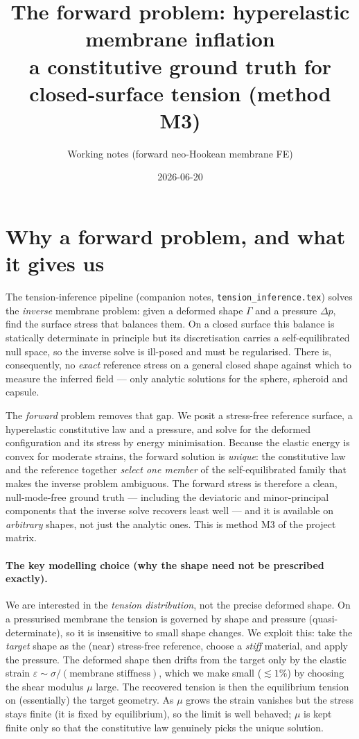 \documentclass[11pt]{article}
\title{The forward problem: hyperelastic membrane inflation\\
\large a constitutive ground truth for closed-surface tension (method M3)}
\author{Working notes (forward neo-Hookean membrane FE)}
\date{2026-06-20}
\begin{document}
\maketitle
\tableofcontents
\bigskip

\section{Why a forward problem, and what it gives us}
\label{sec:why}

The tension-inference pipeline (companion notes, \texttt{tension\_inference.tex})
solves the \emph{inverse} membrane problem: given a deformed shape $\Gamma$ and a
pressure $\Delta p$, find the surface stress that balances them. On a closed surface
this balance is statically determinate in principle but its discretisation carries a
self-equilibrated null space, so the inverse solve is ill-posed and must be
regularised. There is, consequently, no \emph{exact} reference stress on a general
closed shape against which to measure the inferred field --- only analytic solutions
for the sphere, spheroid and capsule.

The \emph{forward} problem removes that gap. We posit a stress-free reference surface,
a hyperelastic constitutive law and a pressure, and solve for the deformed
configuration and its stress by energy minimisation. Because the elastic energy is
convex for moderate strains, the forward solution is \emph{unique}: the constitutive
law and the reference together \emph{select one member} of the self-equilibrated family
that makes the inverse problem ambiguous. The forward stress is therefore a clean,
null-mode-free ground truth --- including the deviatoric and minor-principal components
that the inverse solve recovers least well --- and it is available on
\emph{arbitrary} shapes, not just the analytic ones. This is method M3 of the project
matrix.

\paragraph{The key modelling choice (why the shape need not be prescribed exactly).}
We are interested in the \emph{tension distribution}, not the precise deformed shape.
On a pressurised membrane the tension is governed by shape and pressure
(quasi-determinate), so it is insensitive to small shape changes. We exploit this: take
the \emph{target} shape as the (near) stress-free reference, choose a \emph{stiff}
material, and apply the pressure. The deformed shape then drifts from the target only by
the elastic strain $\varepsilon \sim \sigma/(\text{membrane stiffness})$, which we make
small ($\lesssim 1\%$) by choosing the shear modulus $\mu$ large. The recovered tension
is then the equilibrium tension on (essentially) the target geometry. As $\mu$ grows the
strain vanishes but the stress stays finite (it is fixed by equilibrium), so the limit
is well behaved; $\mu$ is kept finite only so that the constitutive law genuinely picks
the unique solution.
\end{document}

